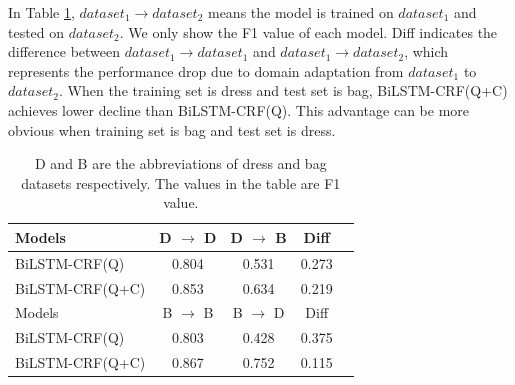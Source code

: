 In Table \ref{tab:domain}, $dataset_1 \rightarrow dataset_2$ means the model is trained on $dataset_1$ and tested on $dataset_2$. We only show the F1 value of each model. Diff indicates the difference between $dataset_1 \rightarrow dataset_1$ and $dataset_1 \rightarrow dataset_2$, which represents the performance drop due to domain adaptation from $dataset_1$ to $dataset_2$. When the training set is dress and test set is bag, BiLSTM-CRF(Q+C) achieves lower decline than BiLSTM-CRF(Q). This advantage can be more obvious when training set is bag and test set is dress.
\begin{table}[th]
	\centering
	\small
	\begin{tabular}{lcccc}
		\toprule
		Models          & D $\rightarrow$ D & D $\rightarrow$ B & Diff  \\
		\midrule
		BiLSTM-CRF(Q)   & 0.804             & 0.531             & 0.273 \\
		BiLSTM-CRF(Q+C) & 0.853             & 0.634             & 0.219 \\
		\bottomrule
		\toprule
		Models          & B $\rightarrow$ B & B $\rightarrow$ D & Diff  \\
		\midrule
		BiLSTM-CRF(Q)   & 0.803             & 0.428             & 0.375 \\
		BiLSTM-CRF(Q+C) & 0.867             & 0.752             & 0.115 \\
		\bottomrule
	\end{tabular}
	\caption{D and B are the abbreviations of dress and bag datasets respectively. The values in the table are F1 value.}
	\label{tab:domain}
	\vspace{-10pt}
\end{table}



